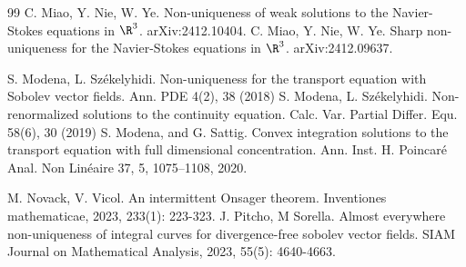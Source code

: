 \documentclass[UTF-8,reqno]{amsart}
\numberwithin{equation}{section}
\theoremstyle{definition}
\begin{document}
\begin{thebibliography}{99}
C. Miao, Y. Nie, W. Ye. Non-uniqueness of weak solutions to the Navier-Stokes equations in $\R^3$. arXiv:2412.10404.
C. Miao, Y. Nie, W. Ye. Sharp non-uniqueness for the Navier-Stokes equations in $\R^3$. arXiv:2412.09637.

S. Modena, L. Sz\'ekelyhidi. Non-uniqueness for the transport equation with Sobolev vector fields.
Ann. PDE 4(2), 38 (2018)
S. Modena, L. Sz\'ekelyhidi. Non-renormalized solutions to the continuity equation. Calc. Var. Partial
Differ. Equ. 58(6), 30 (2019)
S. Modena, and G. Sattig. Convex integration solutions to the transport equation with full dimensional concentration. Ann. Inst. H. Poincar\'e Anal. Non Lin\'eaire 37, 5, 1075–1108, 2020.



M. Novack, V. Vicol. An intermittent Onsager theorem. Inventiones mathematicae, 2023, 233(1): 223-323.
J. Pitcho, M Sorella. Almost everywhere non-uniqueness of integral curves for divergence-free sobolev vector fields.
SIAM Journal on Mathematical Analysis, 2023, 55(5): 4640-4663.


\end{thebibliography}
\end{document}
